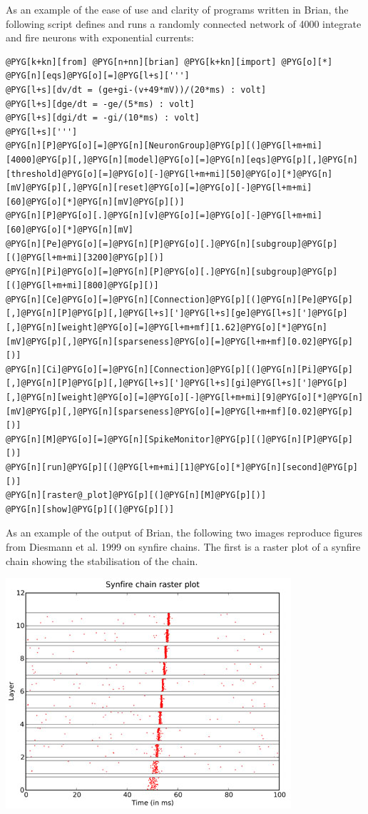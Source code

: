 \documentclass[letterpaper,10pt,english]{manual}
\begin{document}
As an example of the ease of use and clarity of programs written in Brian, the following script defines
and runs a randomly connected network of 4000 integrate and fire neurons with exponential currents:

\begin{Verbatim}[commandchars=@\[\]]
@PYG[k+kn][from] @PYG[n+nn][brian] @PYG[k+kn][import] @PYG[o][*]
@PYG[n][eqs]@PYG[o][=]@PYG[l+s][''']
@PYG[l+s][dv/dt = (ge+gi-(v+49*mV))/(20*ms) : volt]
@PYG[l+s][dge/dt = -ge/(5*ms) : volt]
@PYG[l+s][dgi/dt = -gi/(10*ms) : volt]
@PYG[l+s][''']
@PYG[n][P]@PYG[o][=]@PYG[n][NeuronGroup]@PYG[p][(]@PYG[l+m+mi][4000]@PYG[p][,]@PYG[n][model]@PYG[o][=]@PYG[n][eqs]@PYG[p][,]@PYG[n][threshold]@PYG[o][=]@PYG[o][-]@PYG[l+m+mi][50]@PYG[o][*]@PYG[n][mV]@PYG[p][,]@PYG[n][reset]@PYG[o][=]@PYG[o][-]@PYG[l+m+mi][60]@PYG[o][*]@PYG[n][mV]@PYG[p][)]
@PYG[n][P]@PYG[o][.]@PYG[n][v]@PYG[o][=]@PYG[o][-]@PYG[l+m+mi][60]@PYG[o][*]@PYG[n][mV]
@PYG[n][Pe]@PYG[o][=]@PYG[n][P]@PYG[o][.]@PYG[n][subgroup]@PYG[p][(]@PYG[l+m+mi][3200]@PYG[p][)]
@PYG[n][Pi]@PYG[o][=]@PYG[n][P]@PYG[o][.]@PYG[n][subgroup]@PYG[p][(]@PYG[l+m+mi][800]@PYG[p][)]
@PYG[n][Ce]@PYG[o][=]@PYG[n][Connection]@PYG[p][(]@PYG[n][Pe]@PYG[p][,]@PYG[n][P]@PYG[p][,]@PYG[l+s][']@PYG[l+s][ge]@PYG[l+s][']@PYG[p][,]@PYG[n][weight]@PYG[o][=]@PYG[l+m+mf][1.62]@PYG[o][*]@PYG[n][mV]@PYG[p][,]@PYG[n][sparseness]@PYG[o][=]@PYG[l+m+mf][0.02]@PYG[p][)]
@PYG[n][Ci]@PYG[o][=]@PYG[n][Connection]@PYG[p][(]@PYG[n][Pi]@PYG[p][,]@PYG[n][P]@PYG[p][,]@PYG[l+s][']@PYG[l+s][gi]@PYG[l+s][']@PYG[p][,]@PYG[n][weight]@PYG[o][=]@PYG[o][-]@PYG[l+m+mi][9]@PYG[o][*]@PYG[n][mV]@PYG[p][,]@PYG[n][sparseness]@PYG[o][=]@PYG[l+m+mf][0.02]@PYG[p][)]
@PYG[n][M]@PYG[o][=]@PYG[n][SpikeMonitor]@PYG[p][(]@PYG[n][P]@PYG[p][)]
@PYG[n][run]@PYG[p][(]@PYG[l+m+mi][1]@PYG[o][*]@PYG[n][second]@PYG[p][)]
@PYG[n][raster@_plot]@PYG[p][(]@PYG[n][M]@PYG[p][)]
@PYG[n][show]@PYG[p][(]@PYG[p][)]
\end{Verbatim}

As an example of the output of Brian, the following two images reproduce figures from Diesmann et al. 1999
on synfire chains. The first is a raster plot of a synfire chain showing the stabilisation of the chain.

\includegraphics{synfirechain-example.jpg}
\end{document}
